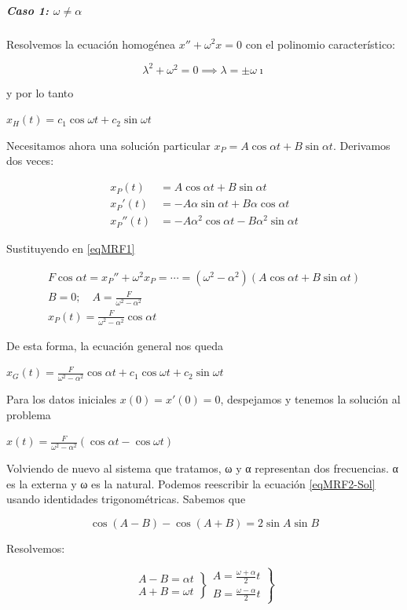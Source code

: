 \documentclass[nochap]{apuntes}
\renewcommand{\i}{\imath}
\begin{document}
\subparagraph{Caso 1: $ω≠α$}

Resolvemos la ecuación homogénea $x''+ω^2 x = 0$ con el polinomio característico:

\[ λ^2+ω^2  = 0 \implies λ = \pm ω\i \]

y por lo tanto

\( x_H(t) = c_1 \cos ωt + c_2 \sin ωt \)

Necesitamos ahora una solución particular $x_P = A\cos αt + B\sin αt$. Derivamos dos veces:

\begin{align*}
x_P(t) &= A\cos αt + B\sin αt \\
x_P'(t) &= -Aα\sin αt + Bα\cos αt \\
x_P''(t) &= -Aα^2\cos αt - Bα^2\sin αt 
\end{align*}

Sustituyendo en \eqref{eqMRF1}

\begin{gather*}
 F\cos αt = x_P'' + ω^2x_P = \dotsb = (ω^2-α^2)\left(A\cos αt + B\sin αt\right) \\
 B = 0;\quad A= \frac{F}{ω^2-α^2} \\
 x_P(t) = \frac{F}{ω^2-α^2}\cos αt
\end{gather*}

De esta forma, la ecuación general nos queda

\( x_G(t) = \frac{F}{ω^2-α^2}\cos αt + c_1 \cos ωt + c_2 \sin ωt \)

Para los datos iniciales $x(0) = x'(0) = 0$, despejamos y tenemos la solución al problema

\(\label{eqMRF2-Sol} x(t) = \frac{F}{ω^2-α^2}\left(\cos αt - \cos ωt\right) \)

Volviendo de nuevo al sistema que tratamos, ω y α representan dos frecuencias. α es la externa y ω es la natural. Podemos reescribir la ecuación \eqref{eqMRF2-Sol} usando identidades trigonométricas. Sabemos que

\[ \cos (A-B) - \cos(A+B) = 2\sin A \sin B \]

Resolvemos:

\[ \left.\begin{matrix}A - B = αt \\ A + B = ωt \end{matrix}\right\}
\left.\begin{matrix}A = \frac{ω+α}{2}t \\ B = \frac{ω-α}{2}t\end{matrix}\right\} \]
\end{document}
